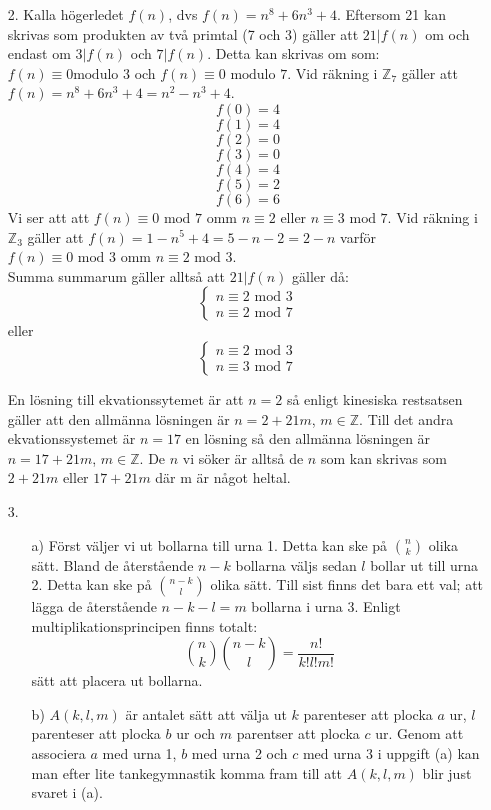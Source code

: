 \documentclass{article}
\begin{document}
\begin{enumerate}
\item[2.]
    Kalla högerledet $f(n)$, dvs $f(n)=n^8+6n^3+4$. Eftersom 21 kan skrivas som
    produkten av två primtal (7 och 3) gäller att $21|f(n)$ om och endast om
    $3|f(n)$ och $7|f(n)$. Detta kan skrivas om som: $f(n) \equiv 0 \text{
    modulo } 3$ och $f(n) \equiv 0 \text{ modulo } 7$. Vid räkning i 
    $\mathbb{Z}_7$ gäller att $f(n) = n^8+6n^3+4 = n^2-n^3+4$.
    $$f(0) = 4$$
    $$f(1) = 4$$
    $$f(2) = 0$$
    $$f(3) = 0$$
    $$f(4) = 4$$
    $$f(5) = 2$$
    $$f(6) = 6$$
    Vi ser att att $f(n) \equiv 0 \text{ mod } 7$ omm $n \equiv 2$ eller $n \equiv 3
    \text{ mod } 7$. Vid räkning i $\mathbb{Z}_3$ gäller att $f(n)=1-n^5+4=5-n-2=2-n$
    varför $f(n) \equiv 0 \text{ mod } 3$ omm $n \equiv 2 \text{ mod } 3$.\\
    Summa summarum gäller alltså att $21|f(n)$ gäller då:
    \[\left\{
        \begin{array}{lr}
            n \equiv 2 \text{ mod } 3\\
            n \equiv 2 \text{ mod } 7
        \end{array}
    \right.\]
    eller
    \[\left\{
        \begin{array}{lr}
            n \equiv 2 \text{ mod } 3\\
            n \equiv 3 \text{ mod } 7
        \end{array}
    \right.\]

    En lösning till ekvationssytemet är att $n=2$ så enligt kinesiska
    restsatsen gäller att den allmänna lösningen är $n=2+21m$, $m \in
    \mathbb{Z}$. Till det andra ekvationssystemet är $n=17$ en lösning så den
    allmänna lösningen är $n=17+21m$, $m \in \mathbb{Z}$. De $n$ vi söker är
    alltså de $n$ som kan skrivas som $2+21m$ eller $17+21m$ där m är något
    heltal.\\

\item[3.]
\begin{itemize}
    \item[a)] Först väljer vi ut bollarna till urna 1. Detta kan ske på
              $\binom{n}{k}$ olika sätt. Bland de återstående $n-k$ bollarna
              väljs sedan $l$ bollar ut till urna 2. Detta kan ske på
              $\binom{n-k}{l}$ olika sätt. Till sist finns det bara ett val;
              att lägga de återstående $n-k-l=m$ bollarna i urna 3. Enligt
              multiplikationsprincipen finns totalt: $$\binom{n}{k}
              \binom{n-k}{l} = \frac{n!}{k! l! m!}$$ sätt att placera ut
              bollarna.
    \item[b)] $A(k,l,m)$ är antalet sätt att välja ut $k$ parenteser att plocka
              $a$ ur, $l$ parenteser att plocka $b$ ur och $m$ parentser att
              plocka $c$ ur. Genom att associera $a$ med urna 1, $b$ med urna 2
              och $c$ med urna 3 i uppgift (a) kan man efter lite
              tankegymnastik komma fram till att $A(k,l,m)$ blir just svaret i
              (a).\\
\end{itemize}


\end{enumerate}
\end{document}
